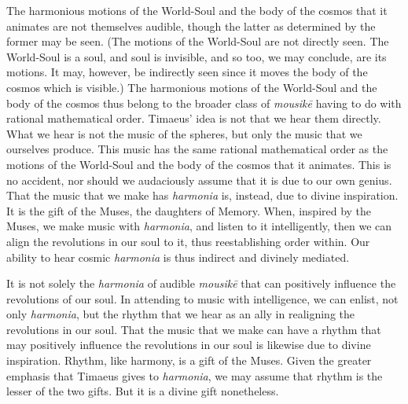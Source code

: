 The harmonious motions of the World-Soul and the body of the cosmos that it animates are not themselves audible, though the latter as determined by the former may be seen. (The motions of the World-Soul are not directly seen. The World-Soul is a soul, and soul is invisible, and so too, we may conclude, are its motions. It may, however, be indirectly seen since it moves the body of the cosmos which is visible.) The harmonious motions of the World-Soul and the body of the cosmos thus belong to the broader class of \emph{mousikē} having to do with rational mathematical order. Timaeus' idea is not that we hear them directly. What we hear is not the music of the spheres, but only the music that we ourselves produce. This music has the same rational mathematical order as the motions of the World-Soul and the body of the cosmos that it animates. This is no accident, nor should we audaciously assume that it is due to our own genius. That the music that we make has \emph{harmonia} is, instead, due to divine inspiration. It is the gift of the Muses, the daughters of Memory. When, inspired by the Muses, we make music with \emph{harmonia}, and listen to it intelligently, then we can align the revolutions in our soul to it, thus reestablishing order within. Our ability to hear cosmic \emph{harmonia} is thus indirect and divinely mediated.

It is not solely the \emph{harmonia} of audible \emph{mousikē} that can positively influence the revolutions of our soul. In attending to music with intelligence, we can enlist, not only \emph{harmonia}, but the rhythm that we hear as an ally in realigning the revolutions in our soul. That the music that we make can have a rhythm that may positively influence the revolutions in our soul is likewise due to divine inspiration. Rhythm, like harmony, is a gift of the Muses. Given the greater emphasis that Timaeus gives to \emph{harmonia}, we may assume that rhythm is the lesser of the two gifts. But it is a divine gift nonetheless.


